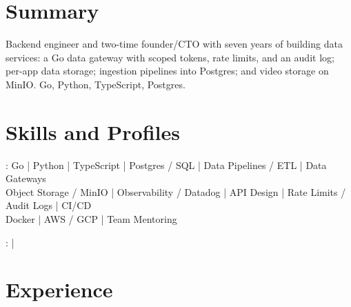 \documentclass[print]{jack-resume}
\begin{document}
\pagecolor{darkmodeBackground}


\begin{minipage}[t][1cm][t]{.03\textwidth}
    \hfill
\end{minipage}

\section{Summary}
Backend engineer and two-time founder/CTO with seven years of building data services: a Go data gateway with scoped tokens, rate limits, and an audit log; per-app data storage; ingestion pipelines into Postgres; and video storage on MinIO. Go, Python, TypeScript, Postgres.
\sectionsep

\section{Skills and Profiles}
:
Go \hfill | \hfill
Python \hfill | \hfill
TypeScript \hfill | \hfill
Postgres / SQL \hfill | \hfill
Data Pipelines / ETL \hfill | \hfill
Data Gateways \\
\hspace{1.0cm} Object Storage / MinIO \hfill | \hfill
Observability / Datadog \hfill | \hfill
API Design \hfill | \hfill
Rate Limits / Audit Logs \hfill | \hfill
CI/CD \\
\hspace{1.0cm} Docker \hfill | \hfill
AWS / GCP \hfill | \hfill
Team Mentoring \\

\raggedright{
    :
      \href{https://www.linkedin.com/in/jack-sturtevant/}{ \ExternalLink} |
     \href{https://github.com/jacksturt}{ \ExternalLink}}

\section{Experience}
\end{document}
